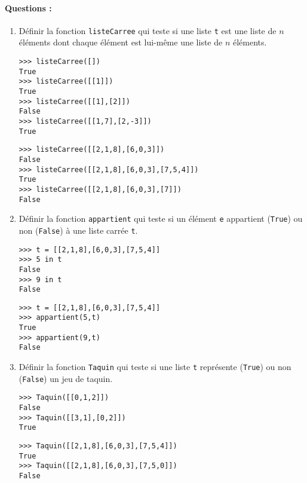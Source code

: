 \documentclass[11pt,a4paper]{article}
\begin{document}
\paragraph{Questions :}\mbox{}
\begin{enumerate}
\item Définir la fonction \texttt{listeCarree} qui teste si une liste \texttt{t} est une
	liste de $n$ éléments dont chaque élément est lui-même une liste de $n$ éléments.

\noindent
\begin{minipage}[t]{7cm}\footnotesize
\begin{Verbatim}
>>> listeCarree([])
True
>>> listeCarree([[1]])
True
>>> listeCarree([[1],[2]])
False
>>> listeCarree([[1,7],[2,-3]])
True
\end{Verbatim}
\end{minipage}
\hfill
\begin{minipage}[t]{7cm}\footnotesize
\begin{Verbatim}
>>> listeCarree([[2,1,8],[6,0,3]])
False
>>> listeCarree([[2,1,8],[6,0,3],[7,5,4]])
True
>>> listeCarree([[2,1,8],[6,0,3],[7]])
False
\end{Verbatim}
\end{minipage}
\vspace*{2mm}

\item Définir la fonction \texttt{appartient} qui teste si un élément \texttt{e}
	appartient (\texttt{True}) ou non (\texttt{False}) à une liste carrée \texttt{t}.

\noindent
\begin{minipage}[t]{7cm}\footnotesize
\begin{Verbatim}
>>> t = [[2,1,8],[6,0,3],[7,5,4]]
>>> 5 in t
False
>>> 9 in t
False
\end{Verbatim}
\end{minipage}
\hfill
\begin{minipage}[t]{7cm}\footnotesize
\begin{Verbatim}
>>> t = [[2,1,8],[6,0,3],[7,5,4]]
>>> appartient(5,t)
True
>>> appartient(9,t)
False
\end{Verbatim}
\end{minipage}
\vspace*{2mm}

	
\item Définir la fonction \texttt{Taquin} qui teste si une liste \texttt{t} représente
	(\texttt{True}) ou non (\texttt{False}) un jeu de taquin.
	
\noindent
\begin{minipage}[t]{7cm}\footnotesize
\begin{Verbatim}
>>> Taquin([[0,1,2]])
False
>>> Taquin([[3,1],[0,2]])
True
\end{Verbatim}
\end{minipage}
\hfill
\begin{minipage}[t]{7cm}\footnotesize
\begin{Verbatim}
>>> Taquin([[2,1,8],[6,0,3],[7,5,4]])
True
>>> Taquin([[2,1,8],[6,0,3],[7,5,0]])
False
\end{Verbatim}
\end{minipage}
\vspace*{2mm}


\end{enumerate}
\end{document}
